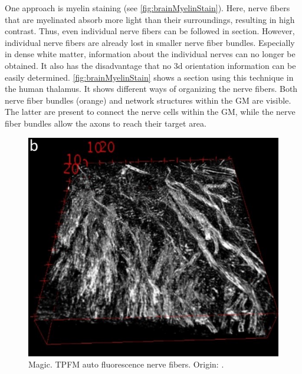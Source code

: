 One approach is myelin staining (see \cref{fig:brainMyelinStain}).
Here, nerve fibers that are myelinated absorb more light than their surroundings, resulting in high contrast.
Thus, even individual nerve fibers can be followed in section.
However, individual nerve fibers are already lost in smaller nerve fiber bundles.
Especially in dense white matter, information about the individual nerves can no longer be obtained.
It also has the disadvantage that no 3d orientation information can be easily determined.
\cref{fig:brainMyelinStain} shows a section using this technique in the human thalamus.
It shows different ways of organizing the nerve fibers.
Both nerve fiber bundles (orange) and network structures within the \ac{GM} are visible.
The latter are present to connect the nerve cells within the \ac{GM}, while the nerve fiber bundles allow the axons to reach their target area.
\par
% 
% 
\begin{figure}[!t]
	\centering
	\includegraphics{gfx/neuroanatomy/magic.png}
	\caption{Magic. TPFM auto fluorescence nerve fibers. Origin: \cite{Costantini2020}.}
	\label{fig:brainTPFM}
\end{figure}
% 

